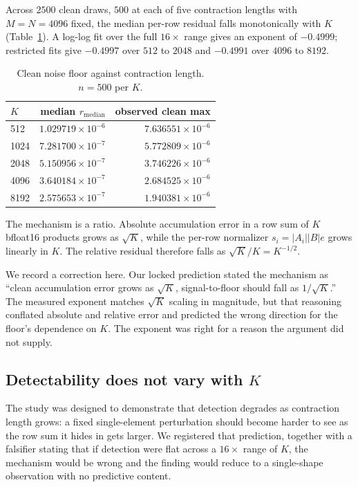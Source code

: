 \documentclass[11pt]{article}
\begin{document}
Across $2500$ clean draws, $500$ at each of five contraction lengths with
$M = N = 4096$ fixed, the median per-row residual falls monotonically with $K$
(Table~\ref{tab:floor}). A log-log fit over the full $16\times$ range gives an
exponent of $-0.4999$; restricted fits give $-0.4997$ over $512$ to $2048$ and
$-0.4991$ over $4096$ to $8192$.

\begin{table}[t]
\centering
\begin{tabular}{lrr}
\toprule
$K$ & median $r_{\text{median}}$ & observed clean max \\
\midrule
512  & $1.029719 \times 10^{-6}$ & $7.636551 \times 10^{-6}$ \\
1024 & $7.281700 \times 10^{-7}$ & $5.772809 \times 10^{-6}$ \\
2048 & $5.150956 \times 10^{-7}$ & $3.746226 \times 10^{-6}$ \\
4096 & $3.640184 \times 10^{-7}$ & $2.684525 \times 10^{-6}$ \\
8192 & $2.575653 \times 10^{-7}$ & $1.940381 \times 10^{-6}$ \\
\bottomrule
\end{tabular}
\caption{Clean noise floor against contraction length. $n = 500$ per $K$.}
\label{tab:floor}
\end{table}

The mechanism is a ratio. Absolute accumulation error in a row sum of $K$
bfloat16 products grows as $\sqrt{K}$, while the per-row normalizer
$s_i = \lvert A_i \rvert \lvert B \rvert e$ grows linearly in $K$. The relative
residual therefore falls as $\sqrt{K} / K = K^{-1/2}$.

We record a correction here. Our locked prediction stated the mechanism as
``clean accumulation error grows as $\sqrt{K}$, signal-to-floor should fall as
$1/\sqrt{K}$.'' The measured exponent matches $\sqrt{K}$ scaling in magnitude,
but that reasoning conflated absolute and relative error and predicted the
wrong direction for the floor's dependence on $K$. The exponent was right for a
reason the argument did not supply.

\subsection{Detectability does not vary with \texorpdfstring{$K$}{K}}
\label{sec:results:kinvariance}

The study was designed to demonstrate that detection degrades as contraction
length grows: a fixed single-element perturbation should become harder to see
as the row sum it hides in gets larger. We registered that prediction, together
with a falsifier stating that if detection were flat across a $16\times$ range
of $K$, the mechanism would be wrong and the finding would reduce to a
single-shape observation with no predictive content.
\end{document}
